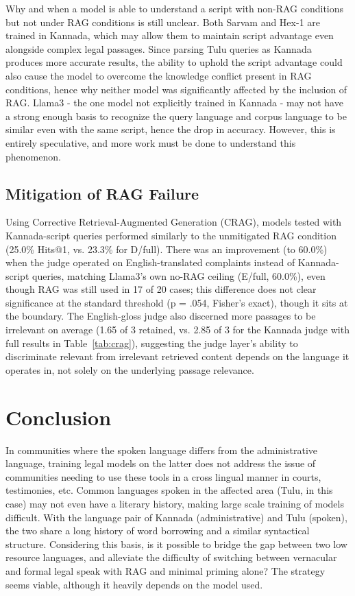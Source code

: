 \documentclass[11pt]{article}
\begin{document}
Why and when a model is able to understand a script with non-RAG conditions but not under RAG conditions is still unclear. Both Sarvam and Hex-1 are trained in Kannada, which may allow them to maintain script advantage even alongside complex legal passages. Since parsing Tulu queries as Kannada produces more accurate results, the ability to uphold the script advantage could also cause the model to overcome the knowledge conflict present in RAG conditions, hence why neither model was significantly affected by the inclusion of RAG. Llama3 - the one model not explicitly trained in Kannada - may not have a strong enough basis to recognize the query language and corpus language to be similar even with the same script, hence the drop in accuracy. However, this is entirely speculative, and more work must be done to understand this phenomenon. 


\subsection{Mitigation of RAG Failure}
\label{sec:mitigation}

Using Corrective Retrieval-Augmented Generation (CRAG), models tested with Kannada-script queries performed similarly to the unmitigated RAG condition (25.0\% Hits@1, vs. 23.3\% for D/full). There was an improvement (to 60.0\%) when the judge operated on English-translated complaints instead of Kannada-script queries, matching Llama3's own no-RAG ceiling (E/full, 60.0\%), even though RAG was still used in 17 of 20 cases; this difference does not clear significance at the standard threshold (p = .054, Fisher's exact), though it sits at the boundary. The English-gloss judge also discerned more passages to be irrelevant on average (1.65 of 3 retained, vs. 2.85 of 3 for the Kannada judge with full results in Table~\ref{tab:crag}), suggesting the judge layer's ability to discriminate relevant from irrelevant retrieved content depends on the language it operates in, not solely on the underlying passage relevance.

\section{Conclusion}
In communities where the spoken language differs from the administrative language, training legal models on the latter does not address the issue of communities needing to use these tools in a cross lingual manner in courts, testimonies, etc. Common languages spoken in the affected area (Tulu, in this case) may not even have a literary history, making large scale training of models difficult. With the language pair of Kannada (administrative) and Tulu (spoken), the two share a long history of word borrowing and a similar syntactical structure. Considering this basis, is it possible to bridge the gap between two low resource languages, and alleviate the difficulty of switching between vernacular and formal legal speak with RAG and minimal priming alone? The strategy seems viable, although it heavily depends on the model used. 
\end{document}
